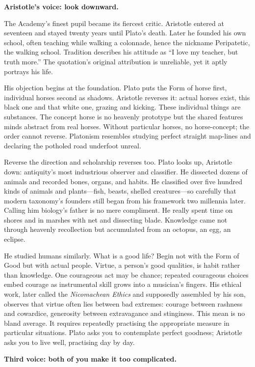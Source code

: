 \textbf{Aristotle's voice: look downward.}

The Academy's finest pupil became its fiercest critic. Aristotle entered at seventeen and stayed twenty years until Plato's death. Later he founded his own school, often teaching while walking a colonnade, hence the nickname Peripatetic, the walking school. Tradition describes his attitude as ``I love my teacher, but truth more.'' The quotation's original attribution is unreliable, yet it aptly portrays his life.

His objection begins at the foundation. Plato puts the Form of horse first, individual horses second as shadows. Aristotle reverses it: actual horses exist, this black one and that white one, grazing and kicking. These individual things are substances. The concept horse is no heavenly prototype but the shared features minds abstract from real horses. Without particular horses, no horse-concept; the order cannot reverse. Platonism resembles studying perfect straight map-lines and declaring the potholed road underfoot unreal.

Reverse the direction and scholarship reverses too. Plato looks up, Aristotle down: antiquity's most industrious observer and classifier. He dissected dozens of animals and recorded bones, organs, and habits. He classified over five hundred kinds of animals and plants---fish, beasts, shelled creatures---so carefully that modern taxonomy's founders still began from his framework two millennia later. Calling him biology's father is no mere compliment. He really spent time on shores and in marshes with net and dissecting blade. Knowledge came not through heavenly recollection but accumulated from an octopus, an egg, an eclipse.

He studied humans similarly. What is a good life? Begin not with the Form of Good but with actual people. Virtue, a person's good qualities, is habit rather than knowledge. One courageous act may be chance; repeated courageous choices embed courage as instrumental skill grows into a musician's fingers. His ethical work, later called the \textit{Nicomachean Ethics} and supposedly assembled by his son, observes that virtue often lies between bad extremes: courage between rashness and cowardice, generosity between extravagance and stinginess. This mean is no bland average. It requires repeatedly practising the appropriate measure in particular situations. Plato asks you to contemplate perfect goodness; Aristotle asks you to live well, practising day by day.

\textbf{Third voice: both of you make it too complicated.}

